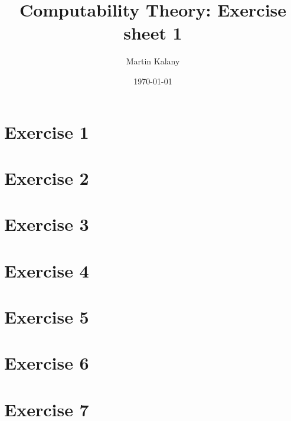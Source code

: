 \documentclass [11pt]{article}
\title{Computability Theory: Exercise sheet 1}
\author{Martin Kalany}
\date{\today}
\begin{document}
\maketitle

\section{Exercise 1}

\section{Exercise 2}

\section{Exercise 3}

\section{Exercise 4}

\section{Exercise 5}

\section{Exercise 6}

\section{Exercise 7}
\end{document}
